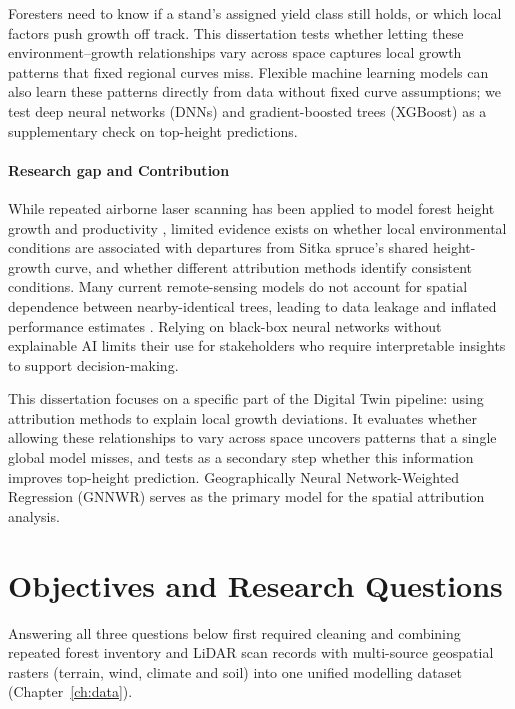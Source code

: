 \documentclass[logo,msc,ai]{infthesis}           %
\begin{document}
Foresters need to know if a stand's assigned yield class still holds, or which local factors push growth off track. This dissertation tests whether letting these environment--growth relationships vary across space captures local growth patterns that fixed regional curves miss. Flexible machine learning models can also learn these patterns directly from data without fixed curve assumptions; we test deep neural networks (DNNs) and gradient-boosted trees (XGBoost) as a supplementary check on top-height predictions.

\paragraph*{Research gap and Contribution}
While repeated airborne laser scanning has been applied to model forest height growth and productivity \cite{janiec2023Development_C1_SS}, limited evidence exists on whether local environmental conditions are associated with departures from Sitka spruce's shared height-growth curve, and whether different attribution methods identify consistent conditions. Many current remote-sensing models do not account for spatial dependence between nearby-identical trees, leading to data leakage and inflated performance estimates \cite{Karasiak2022Spatial_C5_EVAL, ploton2020Spatial_C5_EVAL, lynch2025Digital_C4_NN}. Relying on black-box neural networks without explainable AI limits their use for stakeholders who require interpretable insights to support decision-making.

This dissertation focuses on a specific part of the Digital Twin pipeline: using attribution methods to explain local growth deviations. It evaluates whether allowing these relationships to vary across space uncovers patterns that a single global model misses, and tests as a secondary step whether this information improves top-height prediction. Geographically Neural Network-Weighted Regression (GNNWR) serves as the primary model for the spatial attribution analysis. 

\section{Objectives and Research Questions}

Answering all three questions below first required cleaning and combining repeated forest
inventory and LiDAR scan records with multi-source geospatial rasters (terrain, wind, climate
and soil) into one unified modelling dataset (Chapter~\ref{ch:data}).
\end{document}
